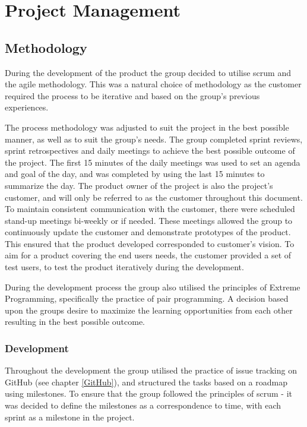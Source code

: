 
\chapter{Project Management}

\section{Methodology}
\label{methodology}
During the development of the product the group decided to utilise scrum and the agile methodology. This was a natural choice of methodology as the customer required the process to be iterative and based on the group's previous experiences.

\noindent The process methodology was adjusted to suit the project in the best possible manner, as well as to suit the group's needs. The group completed sprint reviews, sprint retrospectives and daily meetings to achieve the best possible outcome of the project. The first 15 minutes of the daily meetings was used to set an agenda and goal of the day, and was completed by using the last 15 minutes to summarize the day. The product owner of the project is also the project's customer, and will only be referred to as the customer throughout this document. To maintain consistent communication with the customer, there were scheduled stand-up meetings bi-weekly or if needed. These meetings allowed the group to continuously update the customer and demonstrate prototypes of the product. This ensured that the product developed corresponded to customer's vision. To aim for a product covering the end users needs, the customer provided a set of test users, to test the product iteratively during the development.

During the development process the group also utilised the principles of Extreme Programming, specifically the practice of pair programming. A decision based upon the groups desire to maximize the learning opportunities from each other resulting in the best possible outcome. 

\subsection{Development}
Throughout the development the group utilised the practice of issue tracking on GitHub (see chapter  \ref{GitHub}), and structured the tasks based on a roadmap using milestones. To ensure that the group followed the principles of scrum - it was decided to define the milestones as a correspondence to time, with each sprint as a milestone in the project.

